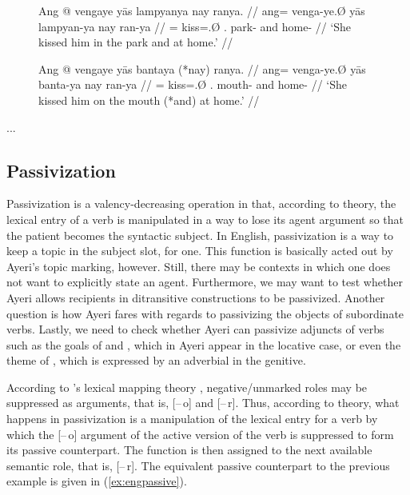 \begin{figure}
\pex\label{ex:multiplace_4}%
\a\label{ex:multiplace_4_1}%
\begingl
	\gla Ang @ vengaye yās lampyanya nay ranya. //
	\glb ang= venga-ye.Ø yās lampyan-ya nay ran-ya //
	\glc \AgtT{}= kiss=\TsgF{}.Ø \TsgM{}.\Parg{} park-\Loc{} and home-\Loc{} //
	\glft `She kissed him in the park and at home.' //
\endgl

\a\label{ex:multiplace_4_2}%
\begingl
	\gla Ang @ vengaye yās bantaya (*nay) ranya. //
	\glb ang= venga-ye.Ø yās banta-ya nay ran-ya //
	\glc \AgtT{}= kiss=\TsgF{}.Ø \TsgM{}.\Parg{} mouth-\Loc{} and 
		home-\Loc{}	//
	\glft `She kissed him on the mouth (*and) at home.' //
\endgl
\xe
\end{figure}

...

\subsection{Passivization}
\label{subsubsec:valdecr}

Passivization is a valency-decreasing operation in that, according to \Lfg{}
theory, the lexical entry of a verb is manipulated in a way to lose its agent
argument so that the patient becomes the syntactic subject. In English,
passivization is a way to keep a topic in the subject slot, for one. This
function is basically acted out by Ayeri's topic marking, however. Still, there
may be contexts in which one does not want to explicitly state an agent.
Furthermore, we may want to test whether Ayeri allows recipients in
ditransitive constructions to be passivized. Another question is how Ayeri
fares with regards to passivizing the objects of subordinate verbs. Lastly, we
need to check whether Ayeri can passivize adjuncts of verbs such as the goals
of  and , which in Ayeri
appear in the locative case, or even the theme of , which is
expressed by an adverbial in the genitive.

According to \Lfg{}'s lexical mapping theory \parencites[324\psqq]{bresnan2016}
[413--414]{needhamtoivonen2011}, negative/unmarked roles may be suppressed as
arguments, that is, [–\,o] and [–\,r]. Thus, according to \Lfg{} theory, what
happens in passivization is a manipulation of the lexical entry for a verb by
which the [–\,o] argument of the active version of the verb is suppressed to
form its passive counterpart. The \Subj{} function is then assigned to the next
available semantic role, that is, [–\,r]. The equivalent passive counterpart to
the previous example is given in (\ref{ex:engpassive}).

